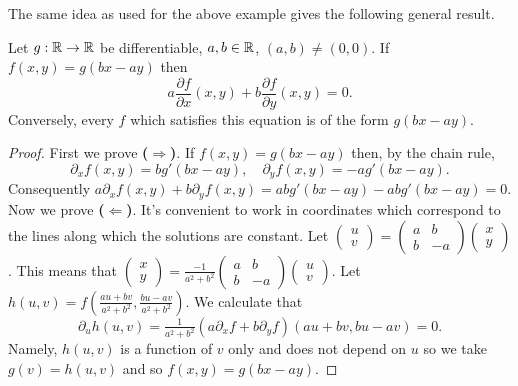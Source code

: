 The same idea as used for the above example gives the following general result.

\begin{theorem}
    Let \(g:\mathbb{R}\to\mathbb{R}\) be differentiable, \(a,b\in \mathbb{R}\), \((a,b)\neq (0,0)\).
    If \(f(x,y)= g(bx-ay)\) then
    \[
        a \frac{\partial f}{\partial x} (x,y) + b \frac{\partial f}{\partial y} (x,y) = 0.
    \]
    Conversely, every \(f\) which satisfies this equation is of the form \(g(bx-ay)\).
\end{theorem}

\begin{proof}
    First we prove \textbf{(\(\boldsymbol\Rightarrow\))}.
    If \(f(x,y)= g(bx-ay)\) then, by the chain rule,
    \[
        \partial_x f(x,y) = bg'(bx-ay),
        \quad
        \partial_y f(x,y) = -ag'(bx-ay).
    \]
    Consequently \(a\partial_x f(x,y) + b \partial_y f(x,y) = a bg'(bx-ay) - abg'(bx-ay) = 0\).
    Now we prove \textbf{(\(\boldsymbol\Leftarrow\))}.
    It's convenient to work in coordinates which correspond to the lines along which the solutions are constant.
    Let \(\left(\begin{smallmatrix}
            u\\ v
        \end{smallmatrix}\right)
    = \left(\begin{smallmatrix}
            a & b \\ b & -a
        \end{smallmatrix}\right)
    \left(\begin{smallmatrix}
            x \\ y
        \end{smallmatrix}\right)\).
    This means that
    \(\left(\begin{smallmatrix}
            x\\ y
        \end{smallmatrix}\right)
    = \frac{-1}{a^2 + b^2} \left(\begin{smallmatrix}
            a & b \\ b & -a
        \end{smallmatrix}\right)
    \left(\begin{smallmatrix}
            u \\ v
        \end{smallmatrix}\right)\).
    Let \(h(u,v)=f(\frac{au + bv}{a^2 + b^2}, \frac{bu-av}{a^2+b^2})\).
    We calculate that
    \[
        \partial_u h(u,v)
        = \tfrac{1}{{a^2 + b^2}}
        \left( a \partial_x f
        + b \partial_y f \right)  (au + bv, bu-av) = 0.
    \]
    Namely, \(h(u,v)\) is a function of \(v\) only and does not depend on \(u\) so we take \(g(v) = h(u,v)\) and so \(f(x,y) = g(bx-ay)\).
\end{proof}

